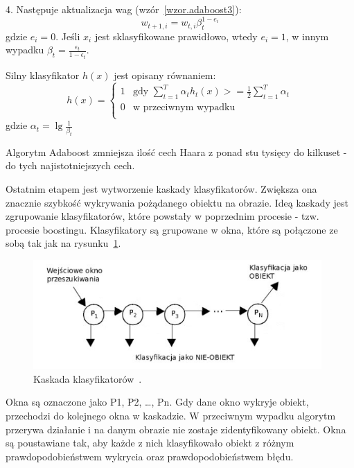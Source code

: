 \documentclass[a4paper,twoside,12pt]{book}
\begin{document}
    4. Następuje aktualizacja wag (wzór~\ref{wzor.adaboost3}):
    \large
    \begin{equation}
        w_{t+1,i} = w_{t,i}\beta_{t}^{1-e_{i}}
        \label{wzor.adaboost3}
    \end{equation}
    \normalsize
    gdzie $e_{i} = 0$. Jeśli $x_{i}$ jest sklasyfikowane prawidłowo, wtedy $e_{i}=1$,
    w innym wypadku $\beta_{t} = \frac{\epsilon_{t}}{1 - \epsilon_{t}}$.

    Silny klasyfikator $h(x)$ jest opisany równaniem:
    \large
    \begin{equation}
        h(x) = \left\{ \begin{array}{ll}
                           1 & \textrm{gdy $\sum_{t=1}^{T}\alpha_{t}h_{t}(x) >= \frac{1}{2} \sum_{t=1}^{T}\alpha_{t}$}\\
                           0 & \textrm{w przeciwnym wypadku}\\
        \end{array} \right.
        \label{wzor.adaboost4}
    \end{equation}
    \normalsize
    gdzie $\alpha_{t} = \lg \frac{1}{\beta_{t}}$

    Algorytm Adaboost zmniejsza ilość cech Haara z ponad stu tysięcy do kilkuset - do tych najistotniejszych cech.

    Ostatnim etapem jest wytworzenie kaskady klasyfikatorów.
    Zwiększa ona znacznie szybkość wykrywania pożądanego obiektu na obrazie.
    Ideą kaskady jest zgrupowanie klasyfikatorów,
    które powstały w poprzednim procesie - tzw. procesie boostingu.
    Klasyfikatory są grupowane w okna,
    które są połączone ze sobą tak jak na rysunku~\ref{fig.kaskadaHaar}.
    \begin{figure}
        \centering
        \includegraphics[width=11cm]{Obrazy/kaskadaHaar.jpg}
        \caption{Kaskada klasyfikatorów~\cite{kaskadaHaarObraz}.}
        \label{fig.kaskadaHaar}
    \end{figure}
    Okna są oznaczone jako P1, P2, \ldots, Pn.
    Gdy dane okno wykryje obiekt, przechodzi do kolejnego okna w kaskadzie.
    W przeciwnym wypadku algorytm przerywa działanie i na danym obrazie nie zostaje zidentyfikowany obiekt.
    Okna są poustawiane tak, aby każde z nich klasyfikowało obiekt z różnym prawdopodobieństwem wykrycia oraz
    prawdopodobieństwem błędu.
\end{document}
